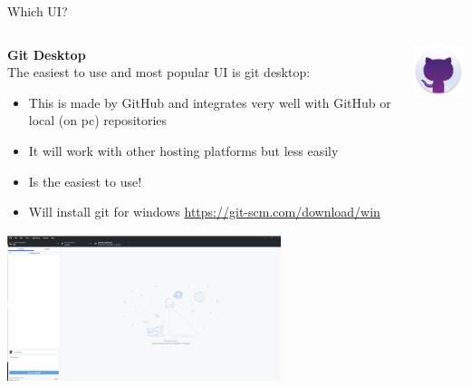 \documentclass[10pt]{beamer}
\begin{document}
{\begin{frame}[fragile]{Which UI?}
\begin{columns}[T]
\begin{column}{.8\textwidth}
\textbf{Git Desktop\\}
The easiest to use and most popular UI is git desktop:
\begin{itemize}
\item This is made by GitHub and integrates very well with GitHub or local (on pc) repositories
\item It will work with other hosting platforms but less easily
\item Is the easiest to use!
\item Will install git for windows \url{https://git-scm.com/download/win}
\end{itemize}
\includegraphics[width=8cm]{Figs/GHD/outline_02}
\end{column}
\begin{column}{.2\textwidth}
\includegraphics[width=2cm]{Figs/git/gitdesktop} \newline \newline \newline 
\end{column}
\end{columns}
\end{frame}


}
\end{document}
